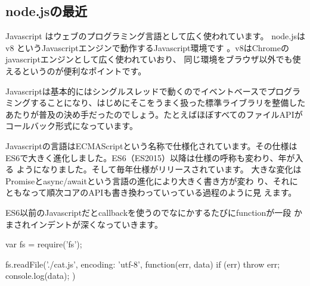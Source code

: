 \documentclass[mingoth,a4paper]{jsarticle}
\begin{document}

\begin{multicols}{2}
{\small

}
\end{multicols}

%
%
%
%




\subsection{node.jsの最近}

Javascript はウェブのプログラミング言語として広く使われています。
node.jsはv8 というJavascriptエンジンで動作するJavascript環境です
\cite{nodejsorg}。v8はChromeのjavascriptエンジンとして広く使われていおり、
同じ環境をブラウザ以外でも使えるというのが便利なポイントです。

Javascriptは基本的にはシングルスレッドで動くのでイベントベースでプログラ
ミングすることになり、はじめにそこをうまく扱った標準ライブラリを整備した
あたりが普及の決め手だったのでしょう。たとえばほぼすべてのファイルAPIが
コールバック形式になっています。

Javascriptの言語はECMAScriptという名称で仕様化されています。その仕様は
ES6で大きく進化しました。ES6（ES2015）以降は仕様の呼称も変わり、年が入る
ようになりました。そして毎年仕様がリリースされています\cite{nodejs-es6}。
大きな変化はPromiseとasync/awaitという言語の進化により大きく書き方が変わ
り、それにともなって順次コアのAPIも書き換わっていっている過程のように見
えます。

ES6以前のJavascriptだとcallbackを使うのでなにかするたびにfunctionが一段
かまされインデントが深くなっていきます。

\begin{commandline}
var fs = require('fs');

fs.readFile('./cat.js', {encoding: 'utf-8'}, function(err, data) {
    if (err) throw err;
    console.log(data);
})
\end{commandline}
\end{document}
